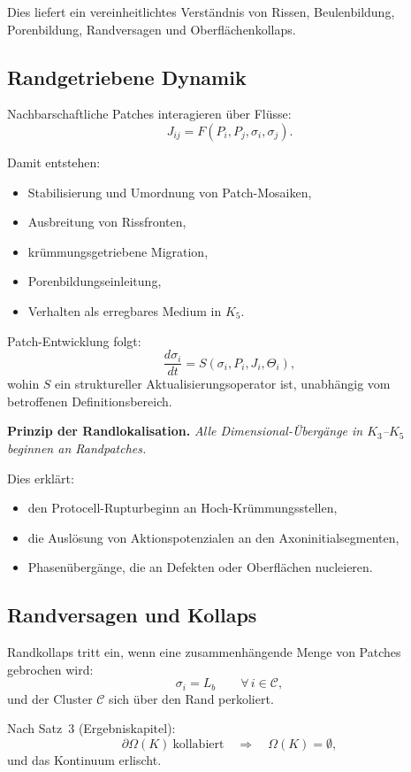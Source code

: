Dies liefert ein vereinheitlichtes Verständnis von Rissen, Beulenbildung, Porenbildung,
Randversagen und Oberflächenkollaps.

\subsection{Randgetriebene Dynamik}

Nachbarschaftliche Patches interagieren über Flüsse:
\[
  J_{ij} = F(P_i, P_j, \sigma_i, \sigma_j).
\]

Damit entstehen:
\begin{itemize}
    \item Stabilisierung und Umordnung von Patch-Mosaiken,
    \item Ausbreitung von Rissfronten,
    \item krümmungsgetriebene Migration,
    \item Porenbildungseinleitung,
    \item Verhalten als erregbares Medium in \(K_5\).
\end{itemize}

Patch-Entwicklung folgt:
\[
  \frac{d\sigma_i}{dt}
  = S(\sigma_i, P_i, J_i, \Theta_i),
\]
wohin \(S\) ein struktureller Aktualisierungsoperator ist, unabhängig vom
betroffenen Definitionsbereich.

\medskip
\textbf{Prinzip der Randlokalisation.}
\emph{Alle Dimensional-Übergänge in \(K_3\)--\(K_5\) beginnen an Randpatches.}

Dies erklärt:
\begin{itemize}
    \item den Protocell-Rupturbeginn an Hoch-Krümmungsstellen,
    \item die Auslösung von Aktionspotenzialen an den Axoninitialsegmenten,
    \item Phasenübergänge, die an Defekten oder Oberflächen nucleieren.
\end{itemize}

\subsection{Randversagen und Kollaps}

Randkollaps tritt ein, wenn eine zusammenhängende Menge von Patches gebrochen wird:
\[
  \sigma_i = L_b
  \qquad \forall\, i \in \mathcal{C},
\]
und der Cluster \(\mathcal{C}\) sich über den Rand perkoliert.

Nach Satz~3 (Ergebniskapitel):
\[
  \partial\Omega(K)\ \text{kollabiert}
  \quad\Longrightarrow\quad
  \Omega(K) = \emptyset,
\]
und das Kontinuum erlischt.


